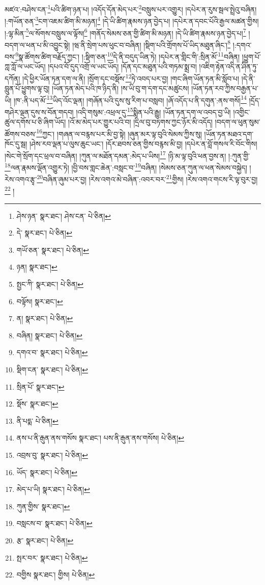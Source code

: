 མཛའ་:བཤེས་ངན་\footnote{ཤེས་ཉན་  སྣར་ཐང་། ཤེས་ངན་  པེ་ཅིན། }པའི་ཚིག་ཉན་པ། །འདོད་དོན་མེད་པར་\footnote{དེ་  སྣར་ཐང་།  པེ་ཅིན། }བསླུས་པར་འགྱུར། །དཔེར་ན་རུས་སྦལ་སྤྲེའུ་བཞིན། །:གཡོན་ཅན་\footnote{གཡོ་ཅན་  སྣར་ཐང་།  པེ་ཅིན། }ངག་འཇམ་ཚིག་མི་མཉན།\footnote{ཉན།  སྣར་ཐང་། } །དེ་ཡི་ཚིག་རྣམས་ཉན་བྱེད་པ། །དཔེར་ན་དབང་པོའི་རྒྱལ་མཚན་གྱིས། །:ལྷ་མིན་\footnote{སྤྱང་ཀི་  སྣར་ཐང་།  པེ་ཅིན། }ལ་སོགས་བསླུས་ལ་ལྟོས།\footnote{བལྟོས།  སྣར་ཐང་། } །གནོད་སེམས་ཅན་གྱི་ཚིག་མི་མཉན། །དེ་ཡི་ཚིག་རྣམས་ཉན་བྱེད་པ།\footnote{ན།  སྣར་ཐང་།  པེ་ཅིན། } །བདག་ལ་ཕན་པ་མི་འབྱུང་སྟེ། །ཝ་ནི་སྲེག་པས་ཕུང་བ་བཞིན། །སྡིག་པའི་གྲོགས་པོ་ཡིད་མཐུན་ཞིང་།\footnote{བཞིན།  སྣར་ཐང་།  པེ་ཅིན། } །:དགའ་བས་\footnote{དགའ་བ་  སྣར་ཐང་།  པེ་ཅིན། }སྣ་ཚོགས་ཚིག་བརྗོད་ཀྱང་། །:སྡིག་ཅན་\footnote{སྡིག་ངན་  སྣར་ཐང་།  པེ་ཅིན། }དེ་ནི་བདུད་ཡིན་ཏེ། །དཔེར་ན་གླིང་གི་:སྲིན་མོ་\footnote{སྲིན་པོ་  སྣར་ཐང་། }བཞིན། །ཕྱུག་པོ་ཀླ་ཀློ་ལ་ཡང་ཡོད། །དཔའ་བོ་དུད་འགྲོ་ལ་ཡང་ཡོད། །དོན་དང་མཐུན་པའི་གཏམ་སྨྲ་བ། །འཇིག་རྟེན་འདི་ན་ཤིན་ཏུ་དཀོན། །དེ་ཕྱིར་ཡོན་ཏན་དག་ལ་ནི། །སྲོག་དང་བསྡོས་\footnote{སྡོས་  སྣར་ཐང་། }ཏེ་འབད་པར་བྱ། །གང་ཞིག་ཡོན་ཏན་མི་སློབ་པ། །དེ་ནི་བླུན་པོ་ཕྱུགས་ལྟ་བུ། །ཡོན་ཏན་མེད་པའི་ཁ་ཉིད་ནི། །ས་ཡི་བུ་ག་དག་དང་མཚུངས། །ཡོན་ཏན་རབ་ཀྱིས་བརྒྱན་པ་ཡི། །ཁ་:ནི་པད་མོ་\footnote{ནི་པདྨ་  པེ་ཅིན། }ཡིད་འོང་ལྡན། །གཞོན་པའི་དུས་སུ་རིག་པ་བསླབ། །ཞོ་འདོད་པ་ནི་དགུན་:ནས་གསོ།\footnote{ནས་པ་ནི་རྒུན་ནས་གསོས  སྣར་ཐང་། པས་ནི་རྒུན་ནས་གསོས།  པེ་ཅིན། } །དྲོད་གཤེར་ལྡན་དུས་ས་བོན་གདབ། །འདི་གསུམ་:འཕྲལ་དུ་\footnote{འབྲས་བུ་  སྣར་ཐང་།  པེ་ཅིན། }སྨིན་པའི་རྒྱུ། །ཡོན་ཏན་དག་ལ་འབད་བྱ་ཡི། །འགྱིང་ཚུལ་དགོས་པ་ཅི་ཞིག་ཡོད། །འོ་མ་མེད་པར་གྱུར་པའི་བ། །དྲིལ་བུ་བཏགས་ཀྱང་ཉོར་མི་འདོད། །བདག་ལ་ཕུན་སུམ་ཚོགས་བཅས་\footnote{ཡོད་  སྣར་ཐང་།  པེ་ཅིན། }ཀྱང་། །གཞན་ལ་བརྙས་པར་མི་བྱ་སྟེ། །ཞུན་མར་ལྟ་བུའི་སེམས་ཀྱིས་སུ། །ཡོན་ཏན་མཐའ་དག་ཁོང་དུ་སྦ། །ཤེས་རབ་ལྡན་པ་ལུས་ཆུང་ཡང་། །དོར་ཐབས་ཅན་གྱིས་བརྙས་མི་བྱ། །དཔེར་ན་བློ་གསལ་རི་བོང་གིས། །སེང་གེ་སྲོག་དང་ཕྲལ་བ་བཞིན། །ཀུན་ལ་མཐོན་དམན་:མེད་པ་ཡིས།\footnote{མེད་པ་ཡི།  སྣར་ཐང་།  པེ་ཅིན། } །ཉི་མ་ལྟ་བུའི་ཕན་བྱས་ན། །:ཀུན་གྱི་\footnote{ཀུན་གྱིས་  སྣར་ཐང་། }ལན་རྣམས་ལྡོན་འགྱུར་ཏེ། །བྱི་བས་གླང་ཆེན་:བསླང་བ་\footnote{བསླངས་བ་  སྣར་ཐང་།  པེ་ཅིན། }བཞིན། །སེམས་ཅན་ཀུན་ལ་ཕན་སེམས་བསྐྱེད། །རེས་འགའ་རྩྭ་\footnote{རྩ་  སྣར་ཐང་།  པེ་ཅིན། }བཞིན་ཞུམ་པར་བྱ། །རེས་འགའ་མེ་བཞིན་:འབར་བར་\footnote{སྤར་བར་  སྣར་ཐང་།  པེ་ཅིན། }གྱིས། །རེས་འགའ་གངས་རི་ལྟ་བུར་བྱ།\footnote{བགྱིས  སྣར་ཐང་། གྱིས།  པེ་ཅིན། } །
